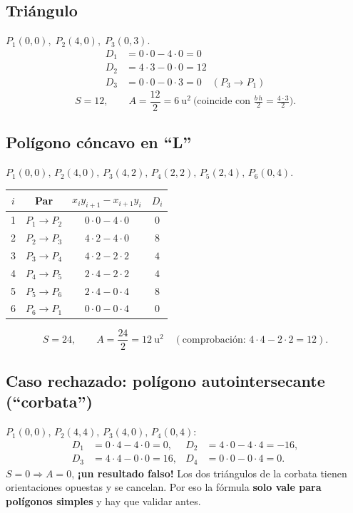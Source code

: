 ﻿\documentclass[11pt,a4paper]{article}
\begin{document}
\subsection{Tri\'angulo}
$P_1(0,0),\;P_2(4,0),\;P_3(0,3)$.
\begin{align*}
D_1&=0\cdot0-4\cdot0=0\\
D_2&=4\cdot3-0\cdot0=12\\
D_3&=0\cdot0-0\cdot3=0\quad(P_3\to P_1)
\end{align*}
\[
S=12,\qquad A=\frac{12}{2}=\boxed{6}\ \text{u}^2\ \text{(coincide con } \tfrac{b\,h}{2}=\tfrac{4\cdot3}{2}\text{)}.
\]

\subsection{Pol\'igono c\'oncavo en ``L''}
$P_1(0,0),\,P_2(4,0),\,P_3(4,2),\,P_4(2,2),\,P_5(2,4),\,P_6(0,4)$.
\begin{center}
\begin{tabular}{@{}cccc@{}}
\toprule
$i$ & Par & $x_iy_{i+1}-x_{i+1}y_i$ & $D_i$\\
\midrule
1 & $P_1\to P_2$ & $0\cdot0-4\cdot0$ & $0$\\
2 & $P_2\to P_3$ & $4\cdot2-4\cdot0$ & $8$\\
3 & $P_3\to P_4$ & $4\cdot2-2\cdot2$ & $4$\\
4 & $P_4\to P_5$ & $2\cdot4-2\cdot2$ & $4$\\
5 & $P_5\to P_6$ & $2\cdot4-0\cdot4$ & $8$\\
6 & $P_6\to P_1$ & $0\cdot0-0\cdot4$ & $0$\\
\bottomrule
\end{tabular}
\end{center}
\[
S=24,\qquad A=\frac{24}{2}=\boxed{12}\ \text{u}^2
\quad(\text{comprobaci\'on: } 4\cdot4-2\cdot2=12).
\]

\subsection{Caso rechazado: pol\'igono autointersecante (``corbata'')}
$P_1(0,0),\,P_2(4,4),\,P_3(4,0),\,P_4(0,4)$:
\begin{align*}
D_1&=0\cdot4-4\cdot0=0, & D_2&=4\cdot0-4\cdot4=-16,\\
D_3&=4\cdot4-0\cdot0=16, & D_4&=0\cdot0-0\cdot4=0.
\end{align*}
$S=0\Rightarrow A=0$, \textbf{¡un resultado falso!} Los dos tri\'angulos de la
corbata tienen orientaciones opuestas y se cancelan. Por eso la f\'ormula
\textbf{solo vale para pol\'igonos simples} y hay que validar antes.
\end{document}
